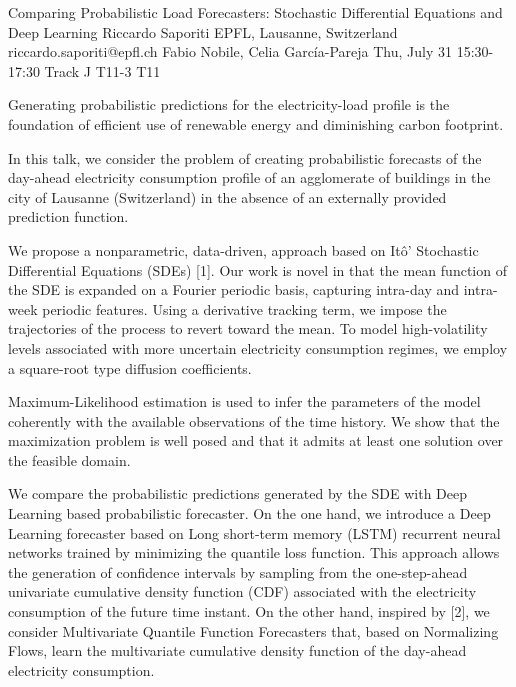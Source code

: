 \begin{talk}
  {Comparing Probabilistic Load Forecasters: Stochastic Differential Equations and Deep Learning}%
  {Riccardo Saporiti}%
  {EPFL, Lausanne, Switzerland}%
  {riccardo.saporiti@epfl.ch}%
  {Fabio Nobile, Celia García-Pareja}%
  {}%
  {Thu, July 31 15:30-17:30 Track J}%
  {T11-3}%
  {T11}%

Generating probabilistic predictions for the electricity-load profile is the foundation of efficient use of renewable energy and diminishing carbon footprint.

In this talk, we consider the problem of creating probabilistic forecasts of the day-ahead electricity consumption profile of an agglomerate of buildings in the city of Lausanne (Switzerland) in the absence of an externally provided prediction function. 
 
We propose a nonparametric, data-driven, approach based on Itô' Stochastic Differential Equations (SDEs) [1]. Our work is novel in that the mean function of the SDE is expanded on a Fourier periodic basis, capturing intra-day and intra-week periodic features. 
Using a derivative tracking term, we impose the trajectories of the process to revert toward the mean. To model high-volatility levels associated with more uncertain electricity consumption regimes, we employ a square-root type diffusion coefficients. 

Maximum-Likelihood estimation is used to infer the parameters of the model coherently with the available observations of the time history. We show that the maximization problem is well posed and that it admits at least one solution over the feasible domain. 

We compare the probabilistic predictions generated by the SDE with Deep Learning based probabilistic forecaster. 
On the one hand, we introduce a Deep Learning forecaster based on Long short-term memory (LSTM) recurrent neural networks trained by minimizing the quantile loss function. This approach allows the generation of confidence intervals by sampling from the one-step-ahead univariate cumulative density function (CDF) associated with the electricity consumption of the future time instant. 
On the other hand, inspired by [2], we consider Multivariate Quantile Function Forecasters that, based on Normalizing Flows, learn the multivariate cumulative density function of the day-ahead electricity consumption.


\end{talk}
